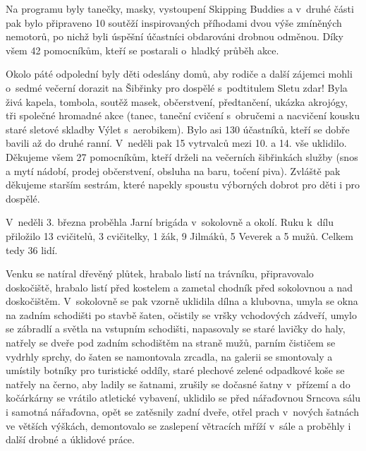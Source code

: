 \documentclass[11pt]{article}
\begin{document}
Na programu byly tanečky, masky, vystoupení Skipping Buddies a v~druhé části pak bylo připraveno 10 soutěží inspirovaných příhodami dvou výše zmíněných nemotorů, po nichž byli úspěšní účastníci obdarováni drobnou odměnou. Díky všem 42 pomocníkům, kteří se postarali o~hladký průběh akce.

Okolo páté odpolední byly děti odeslány domů, aby rodiče a další zájemci mohli o~sedmé večerní dorazit na Šibřinky pro dospělé s~podtitulem Sletu zdar! Byla živá kapela, tombola, soutěž masek, občerstvení, předtančení, ukázka akrojógy, tři společné hromadné akce (tanec, taneční cvičení s~obručemi a nacvičení kousku staré sletové skladby Výlet s~aerobikem). Bylo asi 130 účastníků, kteří se dobře bavili až do druhé ranní. V~neděli pak 15 vytrvalců mezi 10. a 14. vše uklidilo. Děkujeme všem 27 pomocníkům, kteří drželi na večerních šibřinkách služby (snos a mytí nádobí, prodej občerstvení, obsluha na baru, točení piva). Zvláště pak děkujeme starším sestrám, které napekly spoustu výborných dobrot pro děti i pro dospělé.

V~neděli 3. března proběhla Jarní brigáda v~sokolovně a okolí. Ruku k~dílu přiložilo 13 cvičitelů, 3 cvičitelky, 1 žák, 9 Jilmáků, 5 Veverek a 5 mužů. Celkem tedy 36 lidí.

Venku se natíral dřevěný plůtek, hrabalo listí na trávníku, připravovalo doskočiště, hrabalo listí před kostelem a zametal chodník před sokolovnou a nad doskočištěm. V~sokolovně se pak vzorně uklidila dílna a klubovna, umyla se okna na zadním schodišti po stavbě šaten, očistily se vršky vchodových zádveří, umylo se zábradlí a světla na vstupním schodišti, napasovaly se staré lavičky do haly, natřely se dveře pod zadním schodištěm na straně mužů, parním čističem se vydrhly sprchy, do šaten se namontovala zrcadla, na galerii se smontovaly a umístily botníky pro turistické oddíly, staré plechové zelené odpadkové koše se natřely na černo, aby ladily se šatnami, zrušily se dočasné šatny v~přízemí a do kočárkárny se vrátilo atletické vybavení, uklidilo se před nářaďovnou Srncova sálu i samotná nářaďovna, opět se zatěsnily zadní dveře, otřel prach v~nových šatnách ve větších výškách, demontovalo se zaslepení větracích mříží v~sále a proběhly i další drobné a úklidové práce.
\end{document}
